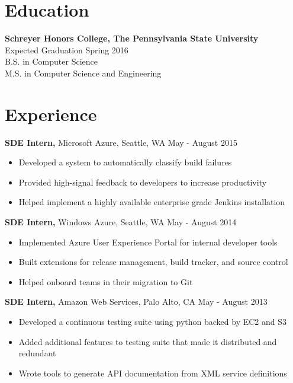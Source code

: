 \documentclass[margin]{res}
\begin{document}
\begin{resume} 

\section{Education} 
{\bf Schreyer Honors College, The Pennsylvania State University} \\
Expected Graduation Spring 2016 \\
B.S. in Computer Science \\
M.S. in Computer Science and Engineering \\

\section{Experience}

{\bf SDE Intern,} Microsoft Azure, Seattle, WA \hfill May - August 2015
\begin{itemize} \itemsep -2pt  %
\item Developed a system to automatically classify build failures
\item Provided high-signal feedback to developers to increase productivity
\item Helped implement a highly available enterprise grade Jenkins installation
\end{itemize}

{\bf SDE Intern,} Windows Azure, Seattle, WA \hfill May - August 2014
\begin{itemize} \itemsep -2pt  %
\item Implemented Azure User Experience Portal for internal developer tools
\item Built extensions for release management, build tracker, and source control
\item Helped onboard teams in their migration to Git
\end{itemize}

{\bf SDE Intern,} Amazon Web Services, Palo Alto, CA \hfill May - August 2013
\begin{itemize} \itemsep -2pt  %
\item Developed a continuous testing suite using python backed by EC2 and S3
\item Added additional features to testing suite that made it distributed and redundant 
\item Wrote tools to generate API documentation from XML service definitions
\end{itemize}


\end{resume}
\end{document}

